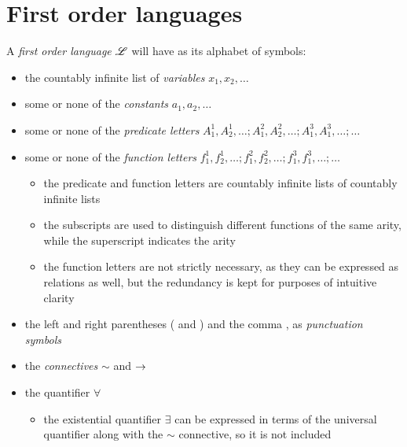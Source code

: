 \section{First order languages}

A \textit{first order language} \(\mathscr{L}\) will have as its alphabet of symbols:
\begin{itemize}
  \item the countably infinite list of \textit{variables} \(x_1, x_2, \dots\)
  \item some or none of the \textit{constants} \(a_1, a_2, \dots\)
  \item some or none of the \textit{predicate letters} \(A^1_1, A^1_2, \dots; A^2_1, A^2_2, \dots; A^3_1, A^3_1, \dots; \dots\)
  \item some or none of the \textit{function letters} \(f^1_1, f^1_2, \dots; f^2_1, f^2_2, \dots; f^3_1, f^3_1, \dots; \dots\)
    \begin{itemize}
      \item the predicate and function letters are countably infinite lists of countably infinite lists
      \item the subscripts are used to distinguish different functions of the same arity, while the superscript indicates the arity
      \item the function letters are not strictly necessary, as they can be expressed as relations as well, but the redundancy is kept for purposes of intuitive clarity
    \end{itemize}
  \item the left and right parentheses ( and ) and the comma , as \textit{punctuation symbols}
  \item the \textit{connectives} \(\sim\) and \(\rightarrow\)
  \item the quantifier \(\forall\)
    \begin{itemize}
      \item the existential quantifier \(\exists\) can be expressed in terms of the universal quantifier along with the \(\sim\) connective, so it is not included
    \end{itemize}
\end{itemize}

